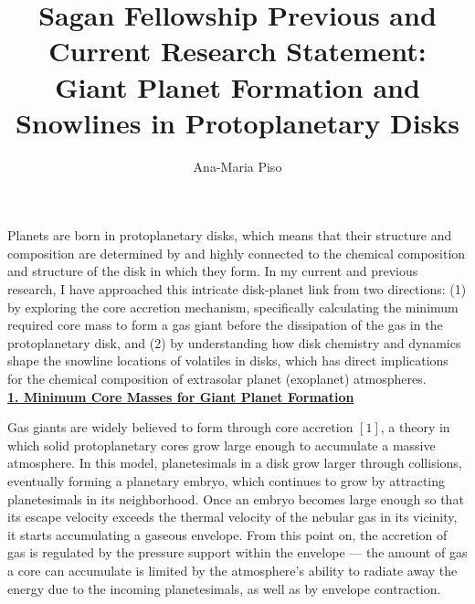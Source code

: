 \documentclass[12pt, letterpaper]{article}
\date{}
\title{\Large Sagan Fellowship Previous and Current Research Statement: \\
Giant Planet Formation and Snowlines in Protoplanetary Disks\vspace{-2ex}}
\author{Ana-Maria Piso \vspace{-2ex}}
\begin{document}
\maketitle


\vspace{-1.5cm}


Planets are born in protoplanetary disks, which means that their structure and composition are determined by and highly connected to the chemical composition and structure of the disk in which they form. In my current and previous research, I have approached this intricate disk-planet link from two directions: (1) by exploring the core accretion mechanism, specifically calculating the minimum required core mass to form a gas giant before the dissipation of the gas in the protoplanetary disk, and (2) by understanding how disk chemistry and dynamics shape the snowline locations of volatiles in disks, which has direct implications for the chemical composition of extrasolar planet (exoplanet) atmospheres. \\
\underline{\textbf{1. Minimum Core Masses for Giant Planet Formation}}

Gas giants are widely believed to form through core accretion $[1]$, a theory in which solid protoplanetary cores grow large enough to accumulate a massive atmosphere. In this model, planetesimals in a disk grow larger through collisions, eventually forming a planetary embryo, which continues to grow by attracting planetesimals in its neighborhood. Once an embryo becomes large enough so that its escape velocity exceeds the thermal velocity of the nebular gas in its vicinity, it starts accumulating a gaseous envelope. From this point on, the accretion of gas is regulated by the pressure support within the envelope --- the amount of gas a core can accumulate is limited by the atmosphere's ability to radiate away the energy due to the incoming planetesimals, as well as by envelope contraction.  
\end{document}
